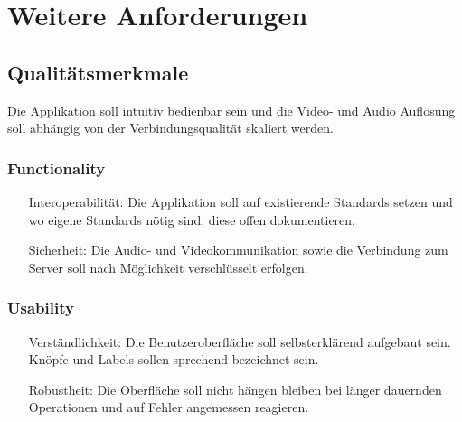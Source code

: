 \chapter{Weitere Anforderungen}

\section{Qualitätsmerkmale}
Die Applikation soll intuitiv bedienbar sein und die Video- und Audio Auflösung soll abhängig von der Verbindungsqualität skaliert werden.


\subsection{Functionality}
\begin{itemize}
	\item[Interoperabilität:] Die Applikation soll auf existierende Standards setzen und wo eigene Standards nötig sind, diese offen dokumentieren.
	\item[Sicherheit:] Die Audio- und Videokommunikation sowie die Verbindung zum Server soll nach Möglichkeit verschlüsselt erfolgen.
\end{itemize}


\subsection{Usability}
\begin{itemize}
	\item[Verständlichkeit:] Die Benutzeroberfläche soll selbsterklärend aufgebaut sein. Knöpfe und Labels sollen sprechend bezeichnet sein.
	\item[Robustheit:] Die Oberfläche soll nicht hängen bleiben bei länger dauernden Operationen und auf Fehler angemessen reagieren.
\end{itemize}

